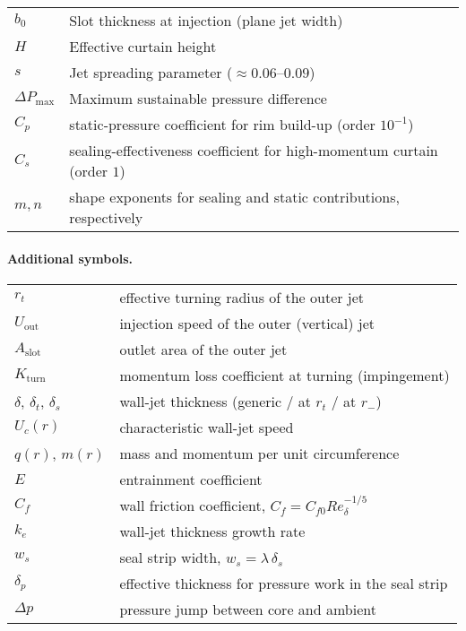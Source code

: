 \documentclass[11pt,a4paper]{article}
\begin{document}
\begin{tabular}{@{}ll@{}}
$b_0$ & Slot thickness at injection (plane jet width) \\
$H$ & Effective curtain height \\
$s$ & Jet spreading parameter ($\approx0.06$--$0.09$) \\
$\Delta P_{\max}$ & Maximum sustainable pressure difference \\
\bottomrule
$C_p$ & static-pressure coefficient for rim build-up (order $10^{-1}$)\\
$C_s$ & sealing-effectiveness coefficient for high-momentum curtain (order $1$)\\
$m,n$ & shape exponents for sealing and static contributions, respectively\\
\end{tabular}


\paragraph{Additional symbols.}
\begin{tabular}{ll}
\(r_t\) & effective turning radius of the outer jet \\
\(U_{\mathrm{out}}\) & injection speed of the outer (vertical) jet \\
\(A_{\mathrm{slot}}\) & outlet area of the outer jet \\
\(K_{\mathrm{turn}}\) & momentum loss coefficient at turning (impingement) \\
\(\delta\), \(\delta_t\), \(\delta_s\) & wall-jet thickness (generic / at \(r_t\) / at \(r_-\)) \\
\(U_c(r)\) & characteristic wall-jet speed \\
\(q(r)\), \(m(r)\) & mass and momentum per unit circumference \\
\(E\) & entrainment coefficient \\
\(C_f\) & wall friction coefficient, \(C_f=C_{f0} Re_\delta^{-1/5}\) \\
\(k_e\) & wall-jet thickness growth rate \\
\(w_s\) & seal strip width, \(w_s=\lambda\,\delta_s\) \\
\(\delta_p\) & effective thickness for pressure work in the seal strip \\
\(\Delta p\) & pressure jump between core and ambient
\end{tabular}
\end{document}
